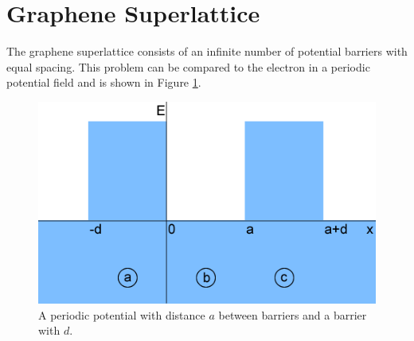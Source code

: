 			\section{Graphene Superlattice}
			\label{Rectangular Barrier - Graphene Superlattice}
			The graphene superlattice consists of an infinite number of potential barriers with equal spacing. This problem can be compared to the electron in a periodic potential field \cite{b32} and is shown in Figure \ref{periodic}.
			\begin{figure}[h]
				\centerline{\includegraphics[scale=0.5]{images/periodic}}
				\caption{A periodic potential with distance $a$ between barriers and a barrier with $d$.}
				\label{periodic}
			\end{figure}

